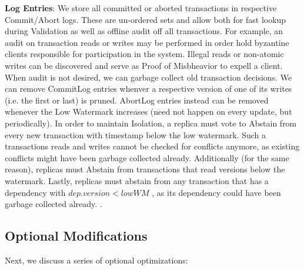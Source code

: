 \textbf{Log Entries}: We store all committed or aborted transactions in respective Commit/Abort logs. These are un-ordered sets and allow both for fast lookup during Validation as well as offline audit off all transactions. For example, an audit on transaction reads or writes may be performed in order hold byzantine clients responsible for participation in the system. Illegal reads or non-atomic writes can be discovered and serve as Proof of Misbheavior to expell a client. When audit is not desired, we can garbage collect old transaction decisions. We can remove CommitLog entries whenver a respective version of one of its writes (i.e. the first or last) is pruned. AbortLog entries instead can be removed whenever the Low Watermark increases (need not happen on every update, but periodically). 
In order to maintain Isolation, a replica must vote to Abstain from every new transaction with timestamp below the low watermark. Such a transactions reads and writes cannot be checked for conflicts anymore, as existing conflicts might have been garbage collected already.  Additionally (for the same reason), replicas must Abstain from transactions that read versions below the watermark.
Lastly, replicas must abstain from any transaction that has a dependency with $dep.version  < lowWM$ , as its dependency could have been garbage collected already. . 






\subsection{Optional Modifications}
Next, we discuss a series of optional optimizations: 

